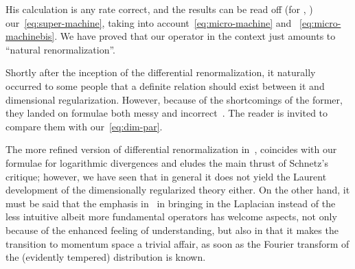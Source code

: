 \documentclass[a4paper,12pt]{article}
\providecommand{\7}{\dagger}           %
\theoremstyle{plain}
\theoremstyle{definition}
\begin{document}
His calculation is any rate correct, and the results can be read off
(for \coordHE{}, \coordHE{}) our~\eqref{eq:super-machine}, taking into
account~\eqref{eq:micro-machine} and ~\eqref{eq:micro-machinebis}. We
have proved that our operator \coordHE{} in the context just amounts to
``natural renormalization''.

Shortly after the inception of the differential renormalization, it
naturally occurred to some people that a definite relation should
exist between it and dimensional regularization. However, because of
the shortcomings of the former, they landed on formulae both messy and
incorrect~\cite{DNuria}. The reader is invited to compare them with
our~\eqref{eq:dim-par}.

The more refined version of differential renormalization
in~\cite{SmirZav}, coincides with our formulae for logarithmic
divergences and eludes the main thrust of Schnetz's critique; however,
we have seen that in general it does not yield the Laurent development
of the dimensionally regularized theory either. On the other hand, it
must be said that the emphasis in~\cite{FJL,NR} in bringing in the
Laplacian instead of the less intuitive albeit more fundamental \coordHE{}
operators has welcome aspects, not only because of the enhanced
feeling of understanding, but also in that it makes the transition to
momentum space a trivial affair, as soon as the Fourier transform of
the (evidently tempered) distribution \coordHE{} is
known.
\end{document}
